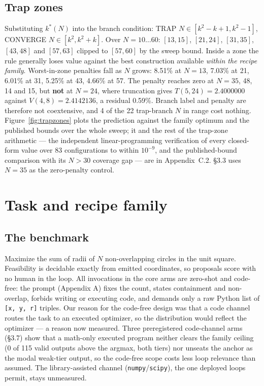 \subsection{Trap zones}

Substituting $k^*(N)$ into the branch condition: TRAP $N \in [k^2-k+1, k^2-1]$, CONVERGE
$N \in [k^2, k^2+k]$. Over $N = 10\ldots60$: $[13,15]$, $[21,24]$, $[31,35]$, $[43,48]$ and
$[57,63]$ clipped to $[57,60]$ by the sweep bound. Inside a zone the rule generally loses value
against the best construction available \emph{within the recipe family}. Worst-in-zone penalties
fall as $N$ grows: 8.51\% at $N = 13$, 7.03\% at 21, 6.01\% at 31, 5.25\% at 43, 4.66\% at 57. The
penalty reaches zero at $N = 35$, 48, 14 and 15, but \textbf{not} at $N = 24$, where truncation
gives $T(5,24) = 2.4000000$ against $V(4,8) = 2.4142136$, a residual 0.59\%. Branch label and
penalty are therefore not coextensive, and 4 of the 22 trap-branch $N$ in range cost nothing.
Figure~\ref{fig:trapzones} plots the prediction against the family optimum and the published bounds
over the whole sweep; it and the rest of the trap-zone arithmetic --- the independent
linear-programming verification of every closed-form value over 83 configurations to within
$10^{-9}$, and the published-bound comparison with its $N > 30$ coverage gap --- are in
Appendix~C.2. \S3.3 uses $N = 35$ as the zero-penalty control.

\section{Task and recipe family}

\subsection{The benchmark}

Maximize the sum of radii of $N$ non-overlapping circles in the unit square. Feasibility is
decidable exactly from emitted coordinates, so proposals score with no human in the loop. All
invocations in the core arms are zero-shot and code-free: the prompt (Appendix A) fixes the count,
states containment and non-overlap, forbids writing or executing code, and demands only a raw
Python list of \texttt{[x, y, r]} triples. Our reason for the code-free design was that a code
channel routes the task to an executed optimizer, so the distribution would reflect the optimizer
--- a reason now measured. Three preregistered code-channel arms (\S3.7) show that a math-only
executed program neither clears the family ceiling (0 of 115 valid outputs above the argmax, both
tiers) nor unseats the anchor as the modal weak-tier output, so the code-free scope costs less loop
relevance than assumed. The library-assisted channel (\texttt{numpy}/\texttt{scipy}), the one
deployed loops permit, stays unmeasured.

